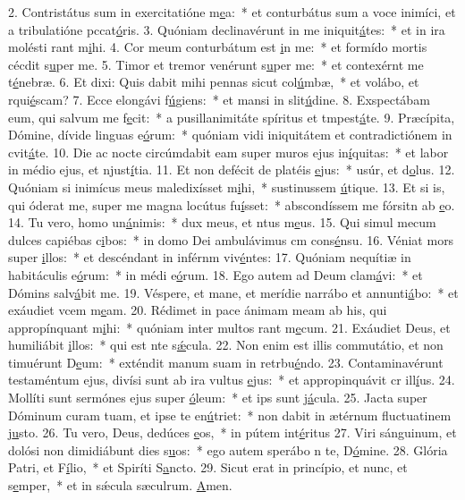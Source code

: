 2. Contristátus sum in exercitatióne m\uline{e}a:~* et conturbátus sum a voce inimíci, et a tribulatióne pccat\uline{ó}ris.
3. Quóniam declinavérunt in me iniquit\uline{á}tes:~* et in ira molésti rant m\uline{i}hi.
4. Cor meum conturbátum est \uline{i}n me:~* et formído mortis cécdit s\uline{u}per me.
5. Timor et tremor venérunt s\uline{u}per me:~* et contexérnt me t\uline{é}nebræ.
6. Et dixi: Quis dabit mihi pennas sicut col\uline{ú}mbæ,~* et volábo, et rqui\uline{é}scam?
7. Ecce elongávi f\uline{ú}giens:~* et mansi in slit\uline{ú}dine.
8. Exspectábam eum, qui salvum me f\uline{e}cit:~* a pusillanimitáte spíritus et tmpest\uline{á}te.
9. Præcípita, Dómine, dívide linguas e\uline{ó}rum:~* quóniam vidi iniquitátem et contradictiónem in cvit\uline{á}te.
10. Die ac nocte circúmdabit eam super muros ejus in\uline{í}quitas:~* et labor in médio ejus, et njust\uline{í}tia.
11. Et non defécit de platéis \uline{e}jus:~* usúr, et d\uline{o}lus.
12. Quóniam si inimícus meus maledixísset m\uline{i}hi,~* sustinussem \uline{ú}tique.
13. Et si is, qui óderat me, super me magna locútus fu\uline{í}sset:~* abscondíssem me fórsitn ab \uline{e}o.
14. Tu vero, homo un\uline{á}nimis:~* dux meus, et ntus m\uline{e}us.
15. Qui simul mecum dulces capiébas c\uline{i}bos:~* in domo Dei ambulávimus cm cons\uline{é}nsu.
16. Véniat mors super \uline{i}llos:~* et descéndant in inférnm viv\uline{é}ntes:
17. Quóniam nequítiæ in habitáculis e\uline{ó}rum:~* in médi e\uline{ó}rum.
18. Ego autem ad Deum clam\uline{á}vi:~* et Dómins salv\uline{á}bit me.
19. Véspere, et mane, et merídie narrábo et annunti\uline{á}bo:~* et exáudiet vcem m\uline{e}am.
20. Rédimet in pace ánimam meam ab his, qui appropínquant m\uline{i}hi:~* quóniam inter multos rant m\uline{e}cum.
21. Exáudiet Deus, et humiliábit \uline{i}llos:~* qui est nte s\uline{ǽ}cula.
22. Non enim est illis commutátio, et non timuérunt D\uline{e}um:~* exténdit manum suam in retrbu\uline{é}ndo.
23. Contaminavérunt testaméntum ejus, divísi sunt ab ira vultus \uline{e}jus:~* et appropinquávit cr ill\uline{í}us.
24. Mollíti sunt sermónes ejus super \uline{ó}leum:~* et ips sunt j\uline{á}cula.
25. Jacta super Dóminum curam tuam, et ipse te en\uline{ú}triet:~* non dabit in ætérnum fluctuatinem j\uline{u}sto.
26. Tu vero, Deus, dedúces \uline{e}os,~* in pútem int\uline{é}ritus
27. Viri sánguinum, et dolósi non dimidiábunt dies s\uline{u}os:~* ego autem sperábo n te, D\uline{ó}mine.
28. Glória Patri, et F\uline{í}lio,~* et Spiríti S\uline{a}ncto.
29. Sicut erat in princípio, et nunc, et s\uline{e}mper,~* et in sǽcula sæculrum. \uline{A}men.

